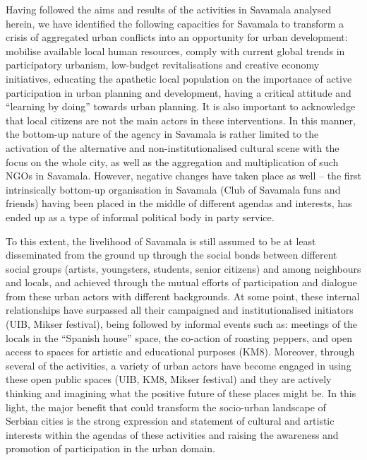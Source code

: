 \documentclass[11pt]{report}
\begin{document}
Having followed the aims and results of the activities in Savamala analysed herein, we have identified the following capacities for Savamala to transform a crisis of aggregated urban conflicts into an opportunity for urban development: mobilise available local human resources, comply with current global trends in participatory urbanism, low-budget revitalisations and creative economy initiatives, educating the apathetic local population on the importance of active participation in urban planning and development, having a critical attitude and “learning by doing” towards urban planning. It is also important to acknowledge that local citizens are not the main actors in these interventions. In this manner, the bottom-up nature of the agency in Savamala is rather limited to the activation of the alternative and non-institutionalised cultural scene with the focus on the whole city, as well as the aggregation and multiplication of such NGOs in Savamala. However, negative changes have taken place as well – the first intrinsically bottom-up organisation in Savamala (Club of Savamala funs and friends) having been placed in the middle of different agendas and interests, has ended up as a type of informal political body in party service.

To this extent, the livelihood of Savamala is still assumed to be at least disseminated from the ground up through the social bonds between different social groups (artists, youngsters, students, senior citizens) and among neighbours and locals, and achieved through the mutual efforts of participation and dialogue from these urban actors with different backgrounds. At some point, these internal relationships have surpassed all their campaigned and institutionalised initiators (UIB, Mikser festival), being followed by informal events such as: meetings of the locals in the “Spanish house” space, the co-action of roasting peppers, and open access to spaces for artistic and educational purposes (KM8). Moreover, through several of the activities, a variety of urban actors have become engaged in using these open public spaces (UIB, KM8, Mikser festival) and they are actively thinking and imagining what the positive future of these places might be. In this light, the major benefit that could transform the socio-urban landscape of Serbian cities is the strong expression and statement of cultural and artistic interests within the agendas of these activities and raising the awareness and promotion of participation in the urban domain.
\end{document}
